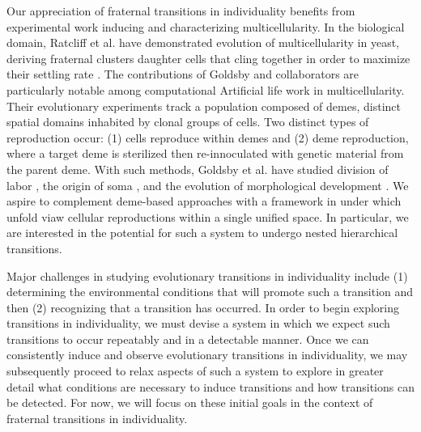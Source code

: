 Our appreciation of fraternal transitions in individuality benefits from experimental work inducing and characterizing multicellularity.
In the biological domain, Ratcliff et al. have demonstrated evolution of multicellularity in yeast, deriving fraternal clusters daughter cells that cling together in order to maximize their settling rate \cite{ratcliff2012experimental}.
The contributions of Goldsby and collaborators are particularly notable among computational Artificial life work in multicellularity.
Their evolutionary experiments track a population composed of demes, distinct spatial domains inhabited by clonal groups of cells.
Two distinct types of reproduction occur: (1) cells reproduce within demes and (2) deme reproduction, where a target deme is sterilized then re-innoculated with genetic material from the parent deme.
With such methods, Goldsby et al. have studied division of labor \cite{goldsby2010evolution, goldsby2012task}, the origin of soma \cite{goldsby2014evolutionary}, and the evolution of morphological development \cite{goldsby2017increasing}.
We aspire to complement deme-based approaches with a framework in under which unfold viaw cellular reproductions within a single unified space.
In particular, we are interested in the potential for such a system to undergo nested hierarchical transitions.

Major challenges in studying evolutionary transitions in individuality include (1) determining the environmental conditions that will promote such a transition and then (2) recognizing that a transition has occurred.
In order to begin exploring transitions in individuality, we must devise a system in which we expect such transitions to occur repeatably and in a detectable manner.
Once we can consistently induce and observe evolutionary transitions in individuality, we may subsequently proceed to relax aspects of such a system to explore in greater detail what conditions are necessary to induce transitions and how transitions can be detected.
For now, we will focus on these initial goals in the context of fraternal transitions in individuality.

